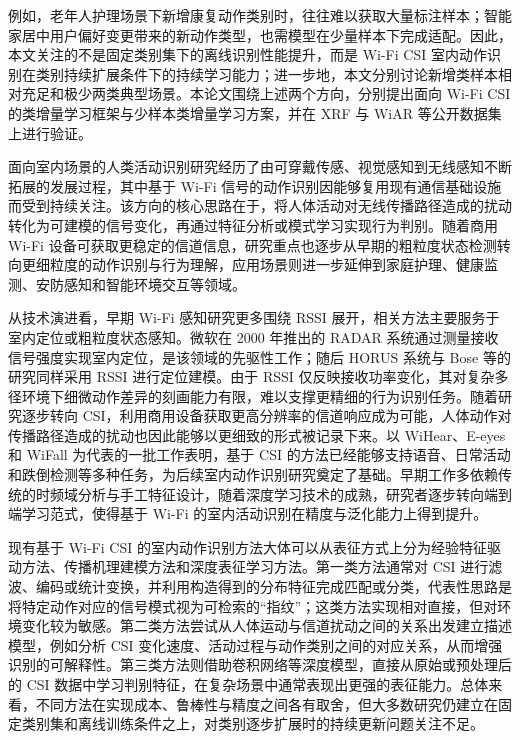 例如，老年人护理场景下新增康复动作类别时，往往难以获取大量标注样本；智能家居中用户偏好变更带来的新动作类型，也需模型在少量样本下完成适配。因此，本文关注的不是固定类别集下的离线识别性能提升，而是 Wi-Fi CSI 室内动作识别在类别持续扩展条件下的持续学习能力；进一步地，本文分别讨论新增类样本相对充足和极少两类典型场景。本论文围绕上述两个方向，分别提出面向 Wi-Fi CSI 的类增量学习框架与少样本类增量学习方案，并在 XRF 与 WiAR 等公开数据集上进行验证。



面向室内场景的人类活动识别研究经历了由可穿戴传感、视觉感知到无线感知不断拓展的发展过程，其中基于 Wi-Fi 信号的动作识别因能够复用现有通信基础设施而受到持续关注。该方向的核心思路在于，将人体活动对无线传播路径造成的扰动转化为可建模的信号变化，再通过特征分析或模式学习实现行为判别。随着商用 Wi-Fi 设备可获取更稳定的信道信息，研究重点也逐步从早期的粗粒度状态检测转向更细粒度的动作识别与行为理解，应用场景则进一步延伸到家庭护理、健康监测、安防感知和智能环境交互等领域\cite{ma2019wifi}。

从技术演进看，早期 Wi-Fi 感知研究更多围绕 RSSI 展开，相关方法主要服务于室内定位或粗粒度状态感知。微软在 2000 年推出的 RADAR 系统\cite{bahl2000radar}通过测量接收信号强度实现室内定位，是该领域的先驱性工作；随后 HORUS 系统\cite{youssef2004horus}与 Bose 等的研究\cite{bose2007pathloss}同样采用 RSSI 进行定位建模。由于 RSSI 仅反映接收功率变化，其对复杂多径环境下细微动作差异的刻画能力有限，难以支撑更精细的行为识别任务。随着研究逐步转向 CSI，利用商用设备获取更高分辨率的信道响应成为可能，人体动作对传播路径造成的扰动也因此能够以更细致的形式被记录下来。以 WiHear、E-eyes 和 WiFall 为代表的一批工作表明\cite{wang2014wihear,wang2014eeyes,wang2016wifall}，基于 CSI 的方法已经能够支持语音、日常活动和跌倒检测等多种任务，为后续室内动作识别研究奠定了基础。早期工作多依赖传统的时频域分析与手工特征设计，随着深度学习技术的成熟，研究者逐步转向端到端学习范式，使得基于 Wi-Fi 的室内活动识别在精度与泛化能力上得到提升。

现有基于 Wi-Fi CSI 的室内动作识别方法大体可以从表征方式上分为经验特征驱动方法、传播机理建模方法和深度表征学习方法。第一类方法通常对 CSI 进行滤波、编码或统计变换，并利用构造得到的分布特征完成匹配或分类，代表性思路是将特定动作对应的信号模式视为可检索的“指纹”；这类方法实现相对直接，但对环境变化较为敏感\cite{wang2014eeyes}。第二类方法尝试从人体运动与信道扰动之间的关系出发建立描述模型，例如分析 CSI 变化速度、活动过程与动作类别之间的对应关系，从而增强识别的可解释性\cite{wang2015csiactivity}。第三类方法则借助卷积网络等深度模型，直接从原始或预处理后的 CSI 数据中学习判别特征，在复杂场景中通常表现出更强的表征能力\cite{zeng2014cnn,cho2018divide}。总体来看，不同方法在实现成本、鲁棒性与精度之间各有取舍，但大多数研究仍建立在固定类别集和离线训练条件之上，对类别逐步扩展时的持续更新问题关注不足。

